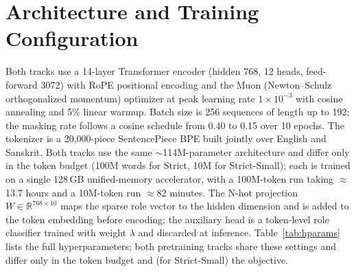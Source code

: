 \documentclass[11pt]{article}
\begin{document}
\section{Architecture and Training Configuration}
\label{app:train}
Both tracks use a 14-layer Transformer encoder (hidden 768, 12 heads, feed-forward 3072) with RoPE positional encoding and the Muon (Newton--Schulz orthogonalized momentum) optimizer at peak learning rate $1\times10^{-3}$ with cosine annealing and 5\% linear warmup. Batch size is 256 sequences of length up to 192; the masking rate follows a cosine schedule from 0.40 to 0.15 over 10 epochs. The tokenizer is a 20{,}000-piece SentencePiece BPE built jointly over English and Sanskrit. Both tracks use the same $\sim$114M-parameter architecture and differ only in the token budget (100M words for Strict, 10M for Strict-Small); each is trained on a single 128\,GB unified-memory accelerator, with a 100M-token run taking $\approx$13.7 hours and a 10M-token run $\approx$82 minutes. The N-hot projection $W\in\mathbb{R}^{768\times10}$ maps the sparse role vector to the hidden dimension and is added to the token embedding before encoding; the auxiliary head is a token-level role classifier trained with weight $\lambda$ and discarded at inference. Table~\ref{tab:hparams} lists the full hyperparameters; both pretraining tracks share these settings and differ only in the token budget and (for Strict-Small) the objective.
\end{document}
